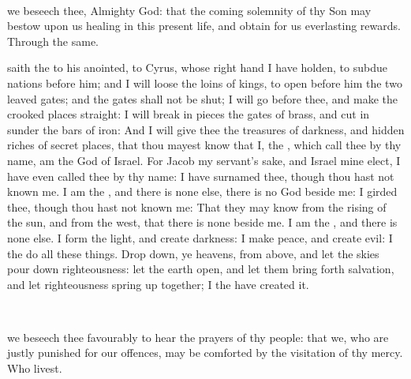 \\


\collect
{} we beseech thee, Almighty God: that the coming solemnity of thy Son may bestow upon us healing in this present life, and obtain for us everlasting rewards. Through the same.

 saith the  to his anointed, to Cyrus, whose right hand I have holden, to subdue nations before him; and I will loose the loins of kings, to open before him the two leaved gates; and the gates shall not be shut; I will go before thee, and make the crooked places straight: I will break in pieces the gates of brass, and cut in sunder the bars of iron: And I will give thee the treasures of darkness, and hidden riches of secret places, that thou mayest know that I, the , which call thee by thy name, am the God of Israel. For Jacob my servant's sake, and Israel mine elect, I have even called thee by thy name: I have surnamed thee, though thou hast not known me. I am the , and there is none else, there is no God beside me: I girded thee, though thou hast not known me: That they may know from the rising of the sun, and from the west, that there is none beside me. I am the , and there is none else. I form the light, and create darkness: I make peace, and create evil: I the  do all these things. Drop down, ye heavens, from above, and let the skies pour down righteousness: let the earth open, and let them bring forth salvation, and let righteousness spring up together; I the  have created it.

\\


\collect
{} we beseech thee favourably to hear the prayers of thy people: that we, who are justly punished for our offences, may be comforted by the visitation of thy mercy. Who livest.

